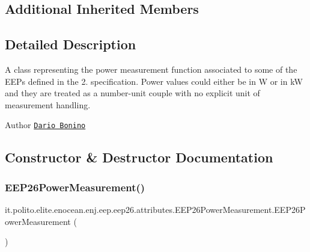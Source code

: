\subsection*{Additional Inherited Members}


\subsection{Detailed Description}
A class representing the power measurement function associated to some of the E\+E\+Ps defined in the 2. specification. Power values could either be in W or in kW and they are treated as a number-\/unit couple with no explicit unit of measurement handling.

\begin{DoxyAuthor}{Author}
\href{mailto:dario.bonino@gmail.com}{\tt Dario Bonino} 
\end{DoxyAuthor}


\subsection{Constructor \& Destructor Documentation}
\hypertarget{classit_1_1polito_1_1elite_1_1enocean_1_1enj_1_1eep_1_1eep26_1_1attributes_1_1_e_e_p26_power_measurement_a3807dcd3faa65c26e9f7a0d1acb2aac8}{}\label{classit_1_1polito_1_1elite_1_1enocean_1_1enj_1_1eep_1_1eep26_1_1attributes_1_1_e_e_p26_power_measurement_a3807dcd3faa65c26e9f7a0d1acb2aac8} 
\subsubsection{\texorpdfstring{E\+E\+P26\+Power\+Measurement()}{EEP26PowerMeasurement()}\hspace{0.1cm}{\footnotesize\ttfamily [1/2]}}
{\footnotesize\ttfamily it.\+polito.\+elite.\+enocean.\+enj.\+eep.\+eep26.\+attributes.\+E\+E\+P26\+Power\+Measurement.\+E\+E\+P26\+Power\+Measurement (\begin{DoxyParamCaption}{ }\end{DoxyParamCaption})}

